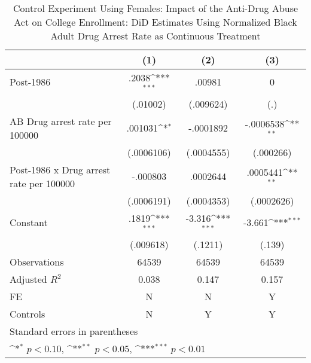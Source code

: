 \begin{table}[htbp]\centering
\def\sym#1{\ifmmode^{#1}\else\(^{#1}\)\fi}
\caption{Control Experiment Using Females: Impact of the Anti-Drug Abuse Act on College Enrollment: DiD Estimates Using Normalized Black Adult Drug Arrest Rate as Continuous Treatment}
\begin{tabular}{l*{3}{c}}
\hline\hline
                    &\multicolumn{1}{c}{(1)}         &\multicolumn{1}{c}{(2)}         &\multicolumn{1}{c}{(3)}         \\
\hline
Post-1986           &       .2038\sym{***}&      .00981         &           0         \\
                    &    (.01002)         &   (.009624)         &         (.)         \\
[1em]
AB Drug arrest rate per 100000&     .001031\sym{*}  &   -.0001892         &   -.0006538\sym{**} \\
                    &  (.0006106)         &  (.0004555)         &   (.000266)         \\
[1em]
Post-1986 x Drug arrest rate per 100000&    -.000803         &    .0002644         &    .0005441\sym{**} \\
                    &  (.0006191)         &  (.0004353)         &  (.0002626)         \\
[1em]
Constant            &       .1819\sym{***}&      -3.316\sym{***}&      -3.661\sym{***}\\
                    &   (.009618)         &     (.1211)         &      (.139)         \\
\hline
Observations        &       64539         &       64539         &       64539         \\
Adjusted \(R^{2}\)  &       0.038         &       0.147         &       0.157         \\
FE                  &           N         &           N         &           Y         \\
Controls            &           N         &           Y         &           Y         \\
\hline\hline
\multicolumn{4}{l}{\footnotesize Standard errors in parentheses}\\
\multicolumn{4}{l}{\footnotesize \sym{*} \(p<0.10\), \sym{**} \(p<0.05\), \sym{***} \(p<0.01\)}\\
\end{tabular}
\end{table}
